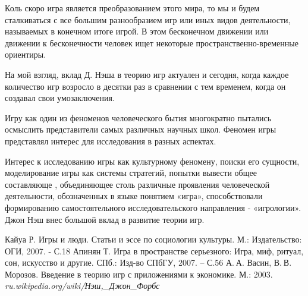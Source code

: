 \documentclass[12pt, a4paper]{article}
\begin{document}
Коль скоро игра является преобразованием этого мира, то мы и будем
сталкиваться с все большим разнообразием игр или иных видов деятельности,
называемых в конечном итоге игрой.
В этом бесконечном движении или движении к бесконечности человек ищет
некоторые пространственно-временные ориентиры.

На мой взгляд, вклад Д. Нэша в теорию игр актуален и сегодня, когда каждое
количество игр возросло в десятки раз в сравнении с тем временем, когда он
создавал свои умозаключения.

Игру как один из феноменов человеческого бытия многократно пытались осмыслить
представители самых различных научных школ.
Феномен игры представлял интерес для исследования в разных аспектах.

Интерес к исследованию игры как культурному феномену, поиски его сущности,
моделирование игры как системы стратегий, попытки вывести общее составляюще
, объединяющее столь различные проявления человеческой деятельности,
обозначенных в языке понятием «игра», способствовали формированию
самостоятельного исследовательского направления - «игрологии».
Джон Нэш внес большой вклад в развитие теории игр. 

\makeatletter
\renewcommand*{\@biblabel}[1]{\hfill#1.}
\makeatother

\begin{thebibliography}{0}
     Кайуа Р. Игры и люди. Статьи и эссе по социологии культуры.
        М.: Издательство: ОГИ, 2007. - С.18 
     Апинян Т. Игра в пространстве серьезного: Игра, миф, ритуал,
        сон, искусство и другие. СПб.: Изд-во СПбГУ, 2007. – С.56 
     А. А. Васин, В. В. Морозов. Введение в теорию игр с 
        приложениями к экономике. М.: 2003.
     {\it ru.wikipedia.org/wiki/Нэш,\_Джон\_Форбс}
\end{thebibliography}
\end{document}
